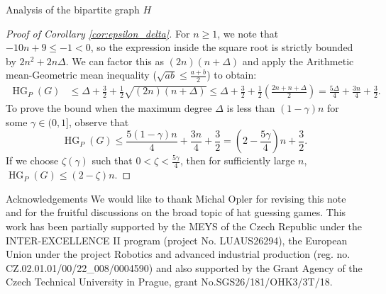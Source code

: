 \documentclass[11pt, letterpaper]{article}
\theoremstyle{plain}
\theoremstyle{plain}
\begin{document}
\begin{section}{Analysis of the bipartite graph $H$}
\begin{proof}[Proof of Corollary \ref{cor:epsilon_delta}]
For $n \ge 1$, we note that $-10n+9 \le -1 < 0$, so the expression inside the square root is strictly bounded by $2n^2 + 2n\Delta$. We can factor this as $(2n)(n+\Delta)$ and apply the Arithmetic mean-Geometric mean inequality ($\sqrt{ab} \leq \frac{a+b}{2}$) to obtain:
\begin{align*}
\operatorname{HG}_{P}(G) &\leq \Delta + \frac{3}{2} + \frac{1}{2}\sqrt{(2n)(n+\Delta)} \leq \Delta + \frac{3}{2} + \frac{1}{2}\left(\frac{2n + n + \Delta}{2}\right) = \frac{5\Delta}{4} + \frac{3n}{4} + \frac{3}{2}.
\end{align*}
    To prove the bound when the maximum degree $\Delta$ is less than $(1-\gamma)n$ for some $\gamma \in (0,1]$, observe that
    $$ \operatorname{HG}_{P}(G) \leq \frac{5(1-\gamma)n}{4} + \frac{3n}{4} + \frac{3}{2} = \left(2 - \frac{5\gamma}{4}\right)n + \frac{3}{2}. $$ 
    If we choose $\zeta(\gamma)$ such that $0 < \zeta < \frac{5\gamma}{4}$, then for sufficiently large $n$, $\operatorname{HG}_{P}(G) \leq (2-\zeta)n$.
\end{proof}
\end{section}
\begin{section}{Acknowledgements}
We would like to thank Michal Opler for revising this note and for the fruitful discussions on the broad topic of hat guessing games. This work has been partially supported by the MEYS of the Czech Republic
under the INTER-EXCELLENCE II program (project No. LUAUS26294), the European Union under the project Robotics and advanced industrial production (reg. no. CZ.02.01.01/00/22\_008/0004590) and also supported by the Grant Agency of the Czech Technical University in Prague, grant No.SGS26/181/OHK3/3T/18.
\end{section}



\end{document}
